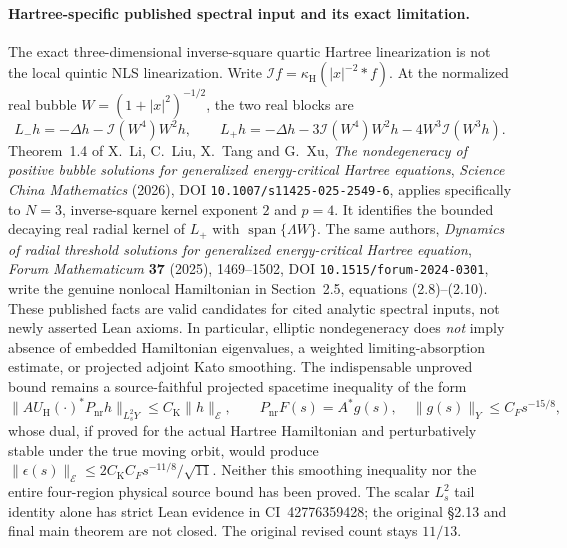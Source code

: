\documentclass[11pt]{amsart}
\begin{document}
\paragraph{Hartree-specific published spectral input and its exact limitation.}
The exact three-dimensional inverse-square quartic Hartree
linearization is not the local quintic NLS linearization.
Write \(\mathcal I f=\kappa_{\mathrm H}(|x|^{-2}*f)\).
At the normalized real bubble \(W=(1+|x|^2)^{-1/2}\),
the two real blocks are
\[
 L_-h=-\Delta h-\mathcal I(W^4)W^2h,\qquad
 L_+h=-\Delta h-3\mathcal I(W^4)W^2h
               -4W^3\mathcal I(W^3h).
\]
Theorem~1.4 of X.~Li, C.~Liu, X.~Tang and G.~Xu,
\emph{The nondegeneracy of positive bubble solutions for
generalized energy-critical Hartree equations},
\emph{Science China Mathematics} (2026),
DOI \texttt{10.1007/s11425-025-2549-6},
applies specifically to \(N=3\), inverse-square
kernel exponent \(2\) and \(p=4\). It identifies the
bounded decaying real radial kernel of \(L_+\)
with \(\operatorname{span}\{\Lambda W\}\).
The same authors, \emph{Dynamics of radial threshold
solutions for generalized energy-critical Hartree equation},
\emph{Forum Mathematicum} \textbf{37} (2025),
1469--1502, DOI \texttt{10.1515/forum-2024-0301},
write the genuine nonlocal Hamiltonian in
Section~2.5, equations (2.8)--(2.10).
These published facts are valid candidates for
cited analytic spectral inputs, not newly asserted
Lean axioms. In particular, elliptic nondegeneracy does
\emph{not} imply absence of embedded Hamiltonian
eigenvalues, a weighted limiting-absorption estimate,
or projected adjoint Kato smoothing.
The indispensable unproved bound remains a
source-faithful projected spacetime inequality of the form
\[
 \|A U_{\mathrm H}(\cdot)^*P_{\mathrm{nr}}h\|_{L_s^2Y}
 \le C_{\mathrm K}\|h\|_{\mathcal E},\qquad
 P_{\mathrm{nr}}F(s)=A^*g(s),\quad
 \|g(s)\|_Y\le C_Fs^{-15/8},
\]
whose dual, if proved for the actual Hartree Hamiltonian
and perturbatively stable under the true moving orbit,
would produce
\(\|\epsilon(s)\|_{\mathcal E}
 \le 2C_{\mathrm K}C_Fs^{-11/8}/\sqrt{11}\).
Neither this smoothing inequality nor the entire
four-region physical source bound has been proved.
The scalar \(L_s^2\) tail identity alone has strict
Lean evidence in CI~42776359428; the original
§2.13 and final main theorem are not closed.
The original revised count stays \(11/13\).
\end{document}

